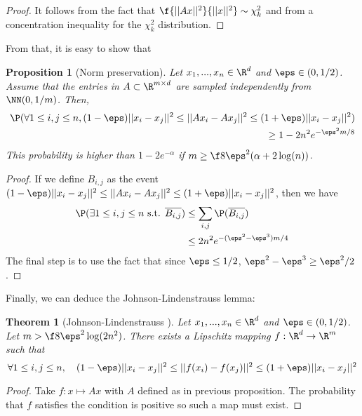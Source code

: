 \documentclass[11pt,a4paper]{article}
\newtheorem{theorem}{Theorem}
\newtheorem{proposition}{Proposition}
\begin{document}
\begin{proof}
It follows from the fact that $\f {||Ax||^2} {||x||^2} \sim \chi^2_k$ and from a concentration inequality for the $\chi^2_k$ distribution.
\end{proof}

From that, it is easy to show that

\begin{proposition}[Norm preservation]
\label{prop:norm}
Let $x_1, ..., x_n \in \R^d$ and $\eps \in (0, 1/2)$. Assume that the entries in $A\subset \R^{m\times d}$ are sampled independently from $\NN(0, 1 / m)$. Then,
\begin{align*}
    \P(\forall 1 \leq i, j\leq n, (1 - \eps) ||x_i - x_j||^2 \leq ||Ax_i - Ax_j||^2 \leq (1 + \eps) ||x_i - x_j||^2 ) &\\
    \geq 1 - 2n^2e^{-\eps^2 m / 8} &
\end{align*}
This probability is higher than $1 - 2e^{-\alpha}$ if $m \geq \f 8 {\eps^2} (\alpha + 2 \log(n))$.
\end{proposition}

\begin{proof}
    If we define $B_{i, j}$ as the event $(1 - \eps) ||x_i - x_j||^2 \leq ||Ax_i - Ax_j||^2 \leq (1 + \eps) ||x_i - x_j||^2$, then we have
    \begin{align*}
        \P(\exists 1 \leq i, j \leq n \text{ s.t. }  \overline{B_{i, j}}) &\leq \sum_{i, j} \P(\overline{B_{i, j}}) \\
        &\leq 2n^2 e^{-(\eps^2 -\eps^3) m / 4}
    \end{align*}
    The final step is to use the fact that since $\eps \leq 1 / 2$, $\eps^2 - \eps^3 \geq \eps^2 / 2$.
\end{proof}

Finally, we can deduce the Johnson-Lindenstrauss lemma:

\begin{theorem}[Johnson-Lindenstrauss \cite{beals_extensions_1984}]
\label{thm:johnson}
Let $x_1, ..., x_n \in \R^d$ and $\eps \in (0, 1/2)$. Let $m > \f 8 {\eps^2} \log(2n^2)$. There exists a Lipschitz mapping $f: \R^d \to \R^m$ such that
$$\forall 1 \leq i, j \leq n, \quad (1 - \eps) ||x_i - x_j||^2 \leq ||f(x_i) - f(x_j)||^2 \leq (1 + \eps) ||x_i - x_j||^2$$
\end{theorem}

\begin{proof}
    Take $f: x \mapsto Ax$ with $A$ defined as in previous proposition. The probability that $f$ satisfies the condition is positive so such a map must exist.
\end{proof}
\end{document}
